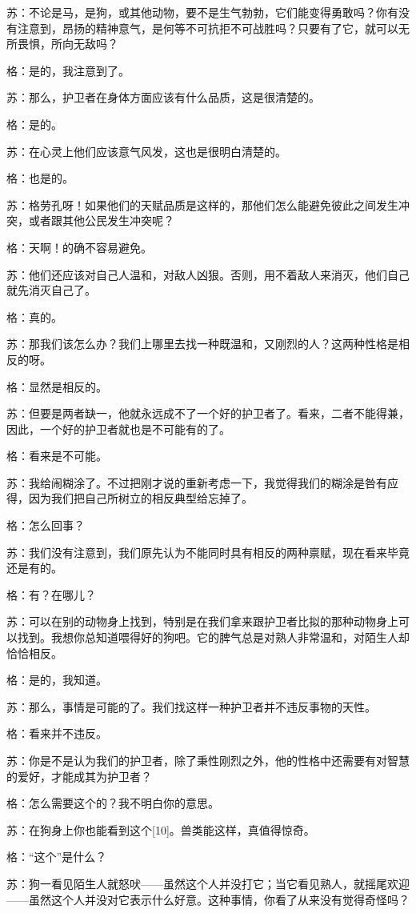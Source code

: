 \documentclass[12pt,oneside]{book}
\begin{document}
苏：不论是马，是狗，或其他动物，要不是生气勃勃，它们能变得勇敢吗？你有没有注意到，昂扬的精神意气，是何等不可抗拒不可战胜吗？只要有了它，就可以无所畏惧，所向无敌吗？

格：是的，我注意到了。

苏：那么，护卫者在身体方面应该有什么品质，这是很清楚的。

格：是的。

苏：在心灵上他们应该意气风发，这也是很明白清楚的。

格：也是的。

苏：格劳孔呀！如果他们的天赋品质是这样的，那他们怎么能避免彼此之间发生冲突，或者跟其他公民发生冲突呢？

格：天啊！的确不容易避免。

苏：他们还应该对自己人温和，对敌人凶狠。否则，用不着敌人来消灭，他们自己就先消灭自己了。

格：真的。

苏：那我们该怎么办？我们上哪里去找一种既温和，又刚烈的人？这两种性格是相反的呀。

格：显然是相反的。

苏：但要是两者缺一，他就永远成不了一个好的护卫者了。看来，二者不能得兼，因此，一个好的护卫者就也是不可能有的了。

格：看来是不可能。

苏：我给闹糊涂了。不过把刚才说的重新考虑一下，我觉得我们的糊涂是咎有应得，因为我们把自己所树立的相反典型给忘掉了。

格：怎么回事？

苏：我们没有注意到，我们原先认为不能同时具有相反的两种禀赋，现在看来毕竟还是有的。

格：有？在哪儿？

苏：可以在别的动物身上找到，特别是在我们拿来跟护卫者比拟的那种动物身上可以找到。我想你总知道喂得好的狗吧。它的脾气总是对熟人非常温和，对陌生人却恰恰相反。

格：是的，我知道。

苏：那么，事情是可能的了。我们找这样一种护卫者并不违反事物的天性。

格：看来并不违反。

苏：你是不是认为我们的护卫者，除了秉性刚烈之外，他的性格中还需要有对智慧的爱好，才能成其为护卫者？

格：怎么需要这个的？我不明白你的意思。

苏：在狗身上你也能看到这个[10]。兽类能这样，真值得惊奇。

格：“这个”是什么？

苏：狗一看见陌生人就怒吠——虽然这个人并没打它；当它看见熟人，就摇尾欢迎——虽然这个人并没对它表示什么好意。这种事情，你看了从来没有觉得奇怪吗？
\end{document}
